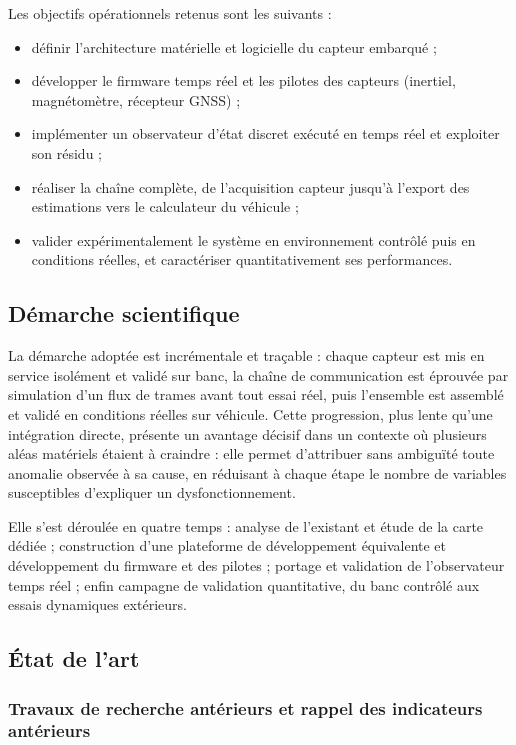 Les objectifs opérationnels retenus sont les suivants :

\begin{itemize}
\item définir l’architecture matérielle et logicielle du capteur embarqué ;
\item développer le firmware temps réel et les pilotes des capteurs (inertiel, magnétomètre, récepteur GNSS) ;
\item implémenter un observateur d’état discret exécuté en temps réel et exploiter son résidu ;
\item réaliser la chaîne complète, de l’acquisition capteur jusqu’à l’export des estimations vers le calculateur du véhicule ;
\item valider expérimentalement le système en environnement contrôlé puis en conditions réelles, et caractériser quantitativement ses performances.
\end{itemize}

\subsection{Démarche scientifique}

La démarche adoptée est incrémentale et traçable : chaque capteur est mis en service isolément et validé sur banc, la chaîne de communication est éprouvée par simulation d’un flux de trames avant tout essai réel, puis l’ensemble est assemblé et validé en conditions réelles sur véhicule. Cette progression, plus lente qu’une intégration directe, présente un avantage décisif dans un contexte où plusieurs aléas matériels étaient à craindre : elle permet d’attribuer sans ambiguïté toute anomalie observée à sa cause, en réduisant à chaque étape le nombre de variables susceptibles d’expliquer un dysfonctionnement.

Elle s’est déroulée en quatre temps : analyse de l’existant et étude de la carte dédiée ; construction d’une plateforme de développement équivalente et développement du firmware et des pilotes ; portage et validation de l’observateur temps réel ; enfin campagne de validation quantitative, du banc contrôlé aux essais dynamiques extérieurs.

\subsection{État de l’art}

\subsubsection{Travaux de recherche antérieurs et rappel des indicateurs antérieurs}

